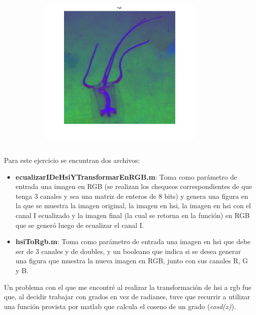 \documentclass{article}
\begin{document}
\begin{figure}[H]
\begin{subfigure}{0.5\textwidth}
        \includegraphics[width=0.9\textwidth]{1901-hsi.png}
    \end{subfigure}\hfill
\end{figure}

\subsection{}

Para este ejercicio se encuntran dos archivos:
\begin{itemize}
\item \textbf{ecualizarIDeHsiYTransformarEnRGB.m}: Toma como parámetro de entrada una imagen en RGB (se realizan los chequeos correspondientes de que tenga 3 canales y sea una matriz de enteros de 8 bits) y 
genera una figura en la que se muestra la imagen original, la imagen en hsi, la imagen en hsi con el canal I ecualizado y la imagen final (la cual se retorna en la función) en RGB que se generó luego de ecualizar el canal I.
\item \textbf{hsiToRgb.m}: Toma como parámetro de entrada una imagen en hsi que debe ser de 3 canales y de doubles, y un booleano que indica si se desea generar una figura que muestra la nueva imagen en RGB, junto con sus canales R, G y B.
\end{itemize}

Un problema con el que me encontré al realizar la transformación de hsi a rgb fue que, al decidir trabajar con grados en vez de radianes, tuve que recurrir a utilizar una función provista por matlab que calcula el coseno de un grado (\textit{cosd(x)}).
\end{document}
